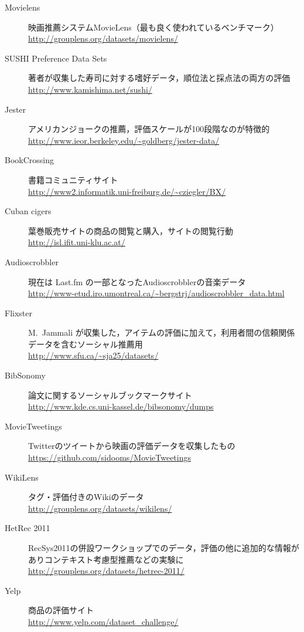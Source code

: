 \begin{description}
\item[Movielens]
映画推薦システムMovieLens（最も良く使われているベンチマーク）\\
\url{http://grouplens.org/datasets/movielens/}
\item[SUSHI Preference Data Sets]
著者が収集した寿司に対する嗜好データ，順位法と採点法の両方の評価\\
\url{http://www.kamishima.net/sushi/}
\item[Jester]
アメリカンジョークの推薦，評価スケールが100段階なのが特徴的\\
\url{http://www.ieor.berkeley.edu/~goldberg/jester-data/}
\item[BookCrossing]
書籍コミュニティサイト\\
\url{http://www2.informatik.uni-freiburg.de/~cziegler/BX/}
\item[Cuban cigers]
葉巻販売サイトの商品の閲覧と購入，サイトの閲覧行動\\
\url{http://isl.ifit.uni-klu.ac.at/}
\item[Audioscrobbler]
現在は Last.fm の一部となったAudioscrobblerの音楽データ\\
\url{http://www-etud.iro.umontreal.ca/~bergstrj/audioscrobbler_data.html}
\item[Flixster]
M.~Jammali が収集した，アイテムの評価に加えて，利用者間の信頼関係データを含むソーシャル推薦用\\
\url{http://www.sfu.ca/~sja25/datasets/}
\item[BibSonomy]
論文に関するソーシャルブックマークサイト\\
\url{http://www.kde.cs.uni-kassel.de/bibsonomy/dumps}
\item[MovieTweetings]
Twitterのツイートから映画の評価データを収集したもの\\
\url{https://github.com/sidooms/MovieTweetings}
\item[WikiLens]
タグ・評価付きのWikiのデータ\\
\url{http://grouplens.org/datasets/wikilens/}
\item[HetRec 2011]
RecSys2011の併設ワークショップでのデータ，評価の他に追加的な情報がありコンテキスト考慮型推薦などの実験に\\
\url{http://grouplens.org/datasets/hetrec-2011/}
\item[Yelp]
商品の評価サイト\\
\url{http://www.yelp.com/dataset_challenge/}
\end{description}

